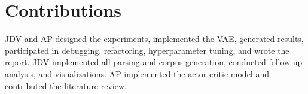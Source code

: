\documentclass[11pt,letterpaper]{article}
\begin{document}
\section*{Contributions}
JDV and AP designed the experiments, implemented the VAE, generated results, participated in debugging, refactoring, hyperparameter tuning, and wrote the report. JDV implemented all parsing and corpus generation, conducted follow up analysis, and visualizations. AP implemented the actor critic model and contributed the literature review.





\end{document}
